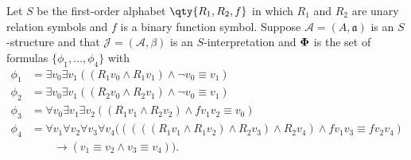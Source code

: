 \documentclass[boxes,pages,color=CornflowerBlue]{homework}
\begin{document}
\begin{problem}
Let $S$ be the first-order alphabet $\qty{R_1, R_2, f}$ in which $R_1$ and $R_2$ are unary relation symbols and $f$ is a binary function symbol.
Suppose $\mathcal{A} = (A, \mathfrak{a})$ is an $S$-structure and that $\mathcal{J} = (\mathcal{A}, \beta)$ is an $S$-interpretation and ${\bf \Phi}$ is the set of formulas $\{\phi_1, \ldots, \phi_4\}$ with
\begin{align*}
    \phi_1 & = \exists v_0 \exists v_1 ((R_1 v_0 \wedge R_1 v_1)\wedge \neg v_0\equiv v_1)                                                            \\
    \phi_2 & = \exists v_0 \exists v_1 ((R_2 v_0 \wedge R_2 v_1)\wedge \neg v_0\equiv v_1)                                                            \\
    \phi_3 & = \forall v_0 \exists v_1 \exists v_2 ((R_1 v_1\wedge R_2 v_2)\wedge fv_1v_2\equiv v_0)                                                  \\
    \phi_4 & = \forall v_1 \forall v_2 \forall v_3 \forall v_4 (((((R_1v_1\wedge R_1 v_2)\wedge R_2 v_3)\wedge R_2 v_4)\wedge fv_1v_3 \equiv fv_2v_4) \\
           & \qquad \rightarrow (v_1\equiv v_2 \wedge v_3\equiv v_4)).
\end{align*}
\end{problem}
\end{document}
